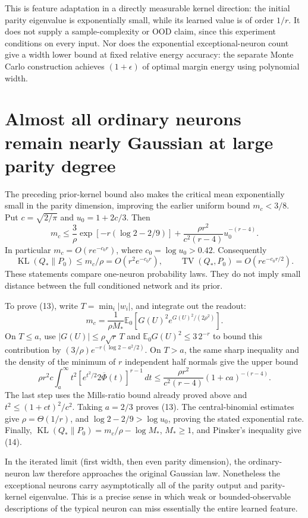 \documentclass[11pt]{article}
\newcommand{\E}{\mathbb E}\newcommand{\Pp}{\mathbb P}
\begin{document}
This is feature adaptation in a directly measurable kernel direction:
the initial parity eigenvalue is exponentially small, while its learned
value is of order $1/r$. It does not supply a sample-complexity or OOD
claim, since this experiment conditions on every input. Nor does the
exponential exceptional-neuron count give a width lower bound at fixed
relative energy accuracy: the separate Monte Carlo construction achieves
$(1+\epsilon)$ of optimal margin energy using polynomial width.

\section{Almost all ordinary neurons remain nearly Gaussian at large parity degree}
The preceding prior-kernel bound also makes the critical mean exponentially
small in the parity dimension, improving the earlier uniform bound $m_c<3/8$.
Put $c=\sqrt{2/\pi}$ and $u_0=1+2c/3$. Then
\[
 m_c\le \frac3\rho\exp[-r(\log2-2/9)]
       +\frac{\rho r^2}{c^2(r-4)}u_0^{-(r-4)}.            \tag{13}
\]
In particular $m_c=O(r e^{-c_0r})$, where $c_0=\log u_0>0.42$.
Consequently
\[
 \operatorname{KL}(Q_*\|P_0)\le m_c/\rho
       =O(r^2e^{-c_0r}),\qquad
 \operatorname{TV}(Q_*,P_0)=O(r e^{-c_0r/2}).              \tag{14}
\]
These statements compare one-neuron probability laws. They do not imply
small distance between the full conditioned network and its prior.

To prove (13), write $T=\min_i|w_i|$, and integrate out the readout:
\[
 m_c=\frac1{\rho M_*}\E_0[G(U)^2e^{G(U)^2/(2\rho^2)}].
\]
On $T\le a$, use $|G(U)|\le\rho\sqrt r\,T$ and
$\E_0G(U)^2\le3\,2^{-r}$ to bound this contribution by
$(3/\rho)e^{-r(\log2-a^2/2)}$.
On $T>a$, the same sharp inequality and the density of the minimum of
$r$ independent half normals give the upper bound
\[
 \rho r^2c\int_a^\infty t^2
       [e^{t^2/2}2\overline\Phi(t)]^{r-1}\,dt
 \le \frac{\rho r^2}{c^2(r-4)}(1+ca)^{-(r-4)}.
\]
The last step uses the Mills-ratio bound already proved above and
$t^2\le(1+ct)^2/c^2$. Taking $a=2/3$ proves (13).
The central-binomial estimates give $\rho=\Theta(1/r)$, and
$\log2-2/9>\log u_0$, proving the stated exponential rate.
Finally, $\operatorname{KL}(Q_*\|P_0)=m_c/\rho-\log M_*$,
$M_*\ge1$, and Pinsker's inequality give (14).

In the iterated limit (first width, then even parity dimension), the
ordinary-neuron law therefore approaches the original Gaussian law.
Nonetheless the exceptional neurons carry asymptotically all of the
parity output and parity-kernel eigenvalue. This is a precise sense in
which weak or bounded-observable descriptions of the typical neuron
can miss essentially the entire learned feature.
\end{document}
